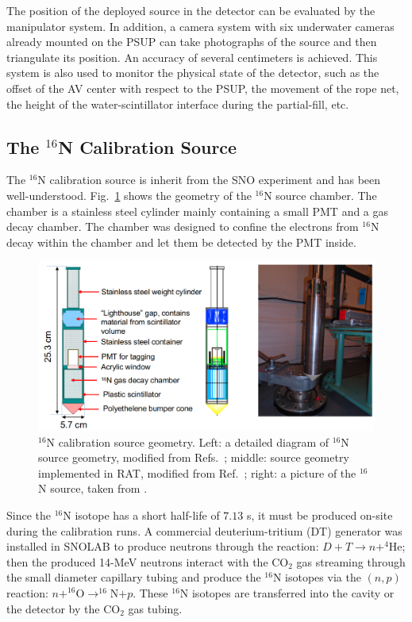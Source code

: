 The position of the deployed source in the detector can be evaluated by the manipulator system. In addition, a camera system with six underwater cameras already mounted on the PSUP can take photographs of the source and then triangulate its position. An accuracy of several centimeters is achieved. This system is also used to monitor the physical state of the detector, such as the offset of the AV center with respect to the PSUP, the movement of the rope net, the height of the water-scintillator interface during the partial-fill, etc\cite{singh2020underwater,snop_jinst}.

\subsection{The $^{16}$N Calibration Source}\label{sect:n16}
The $^{16}$N calibration source is inherit from the SNO experiment and has been well-understood\cite{dragowsky1999sudbury,dragowsky200216n,hamer2001energy}. Fig.~\ref{n16pic} shows the geometry of the $^{16}$N source chamber. The chamber is a stainless steel cylinder mainly containing a small PMT and a gas decay chamber. The chamber was designed to confine the electrons from $^{16}$N decay within the chamber and let them be detected by the PMT inside\cite{dragowsky1999sudbury}.

\begin{figure}[!htb]
	\centering
	\includegraphics[width=12cm]{n16geom.png}
	\caption[$^{16}$N calibration source geometry.]{$^{16}$N calibration source geometry. Left: a detailed diagram of $^{16}$N source geometry, modified from Refs.~\cite{maclellan2009energy,matt_deployedsource}; middle: source geometry implemented in RAT, modified from Ref.~\cite{n16geom_zach}; right: a picture of the $^{16}$N source, taken from \cite{n16pic}.}
	\label{n16pic}
\end{figure}

Since the $^{16}$N isotope has a short half-life of $7.13$ s, it must be produced on-site during the calibration runs. A commercial deuterium-tritium (DT) generator was installed in SNOLAB to produce neutrons through the reaction: $D+T\to n+^{4}$He; then the produced 14-MeV neutrons interact with the CO$_2$ gas streaming through the small diameter capillary tubing and produce the $^{16}$N isotopes via the $(n,p)$ reaction: $n+^{16}$O$\to^{16}$N$+p$. These $^{16}$N isotopes are transferred into the cavity or the detector by the CO$_2$ gas tubing\cite{dragowsky200216n}.  

